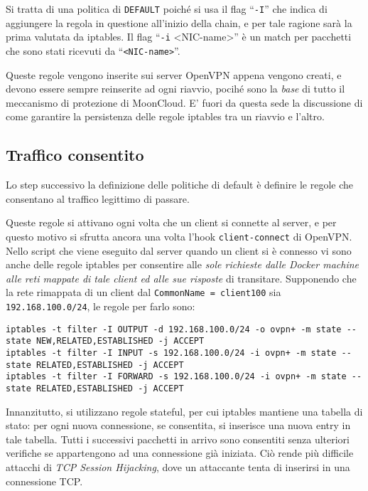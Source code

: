 		Si tratta di una politica di \texttt{DEFAULT} poiché si usa il flag ``\texttt{-I}''
		che indica di aggiungere la regola in questione all'inizio della chain, e per tale
		ragione sarà la prima valutata da iptables. Il flag ``\texttt{-i} <NIC-name>'' è un match
		per pacchetti che sono stati ricevuti da ``\texttt{<NIC-name>}''.
		
		
		Queste regole vengono inserite sui server OpenVPN appena vengono creati, e
		devono essere sempre reinserite ad ogni riavvio, pocihé sono la \textit{base}
		di tutto il meccanismo di protezione di MoonCloud. E' fuori da questa sede la discussione
		di come garantire la persistenza delle regole iptables tra un riavvio e l'altro.
		
		
		\subsection{Traffico consentito}
		Lo step successivo la definizione delle politiche di default è definire le regole che
		consentano al traffico legittimo di passare.
		
		Queste regole si attivano ogni volta che un client si connette al server, e per
		questo motivo si sfrutta ancora una volta l'hook \texttt{client-connect} di OpenVPN.
		Nello script che viene eseguito dal server quando un client si è connesso vi sono
		anche delle regole iptables per consentire alle \textit{sole richieste
		dalle Docker machine alle reti mappate di tale client ed alle sue risposte}
		di transitare.
		Supponendo che la rete rimappata di un client dal \texttt{CommonName = client100} sia
		\texttt{192.168.100.0/24}, le regole per farlo sono:
\begin{verbatim}
iptables -t filter -I OUTPUT -d 192.168.100.0/24 -o ovpn+ -m state --state NEW,RELATED,ESTABLISHED -j ACCEPT
iptables -t filter -I INPUT -s 192.168.100.0/24 -i ovpn+ -m state --state RELATED,ESTABLISHED -j ACCEPT
iptables -t filter -I FORWARD -s 192.168.100.0/24 -i ovpn+ -m state --state RELATED,ESTABLISHED -j ACCEPT
\end{verbatim}
		
		Innanzitutto, si utilizzano regole stateful, per cui iptables mantiene
		una tabella di stato: per ogni nuova connessione, se consentita, si inserisce
		una nuova entry in tale tabella. Tutti i successivi pacchetti in arrivo sono consentiti
		senza ulteriori verifiche
		se appartengono ad una connessione già iniziata.
 		Ciò rende più difficile
		attacchi di \textit{TCP Session Hijacking}, dove un attaccante tenta di inserirsi in
		una connessione TCP.
		
